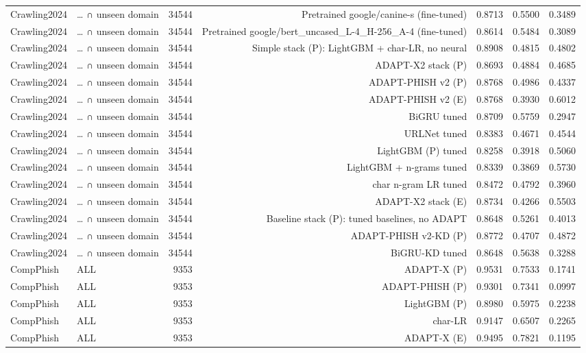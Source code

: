 \begin{table}[t]
\begin{tabular}{llrrrrr}
Crawling2024 & … ∩ unseen domain & 34544 & Pretrained google/canine-s (fine-tuned) & 0.8713 & 0.5500 & 0.3489 \\
Crawling2024 & … ∩ unseen domain & 34544 & Pretrained google/bert\_uncased\_L-4\_H-256\_A-4 (fine-tuned) & 0.8614 & 0.5484 & 0.3089 \\
Crawling2024 & … ∩ unseen domain & 34544 & Simple stack (P): LightGBM + char-LR, no neural & 0.8908 & 0.4815 & 0.4802 \\
Crawling2024 & … ∩ unseen domain & 34544 & ADAPT-X2 stack (P) & 0.8693 & 0.4884 & 0.4685 \\
Crawling2024 & … ∩ unseen domain & 34544 & ADAPT-PHISH v2 (P) & 0.8768 & 0.4986 & 0.4337 \\
Crawling2024 & … ∩ unseen domain & 34544 & ADAPT-PHISH v2 (E) & 0.8768 & 0.3930 & 0.6012 \\
Crawling2024 & … ∩ unseen domain & 34544 & BiGRU tuned & 0.8709 & 0.5759 & 0.2947 \\
Crawling2024 & … ∩ unseen domain & 34544 & URLNet tuned & 0.8383 & 0.4671 & 0.4544 \\
Crawling2024 & … ∩ unseen domain & 34544 & LightGBM (P) tuned & 0.8258 & 0.3918 & 0.5060 \\
Crawling2024 & … ∩ unseen domain & 34544 & LightGBM + n-grams tuned & 0.8339 & 0.3869 & 0.5730 \\
Crawling2024 & … ∩ unseen domain & 34544 & char n-gram LR tuned & 0.8472 & 0.4792 & 0.3960 \\
Crawling2024 & … ∩ unseen domain & 34544 & ADAPT-X2 stack (E) & 0.8734 & 0.4266 & 0.5503 \\
Crawling2024 & … ∩ unseen domain & 34544 & Baseline stack (P): tuned baselines, no ADAPT & 0.8648 & 0.5261 & 0.4013 \\
Crawling2024 & … ∩ unseen domain & 34544 & ADAPT-PHISH v2-KD (P) & 0.8772 & 0.4707 & 0.4872 \\
Crawling2024 & … ∩ unseen domain & 34544 & BiGRU-KD tuned & 0.8648 & 0.5638 & 0.3288 \\
CompPhish & ALL & 9353 & ADAPT-X (P) & 0.9531 & 0.7533 & 0.1741 \\
CompPhish & ALL & 9353 & ADAPT-PHISH (P) & 0.9301 & 0.7341 & 0.0997 \\
CompPhish & ALL & 9353 & LightGBM (P) & 0.8980 & 0.5975 & 0.2238 \\
CompPhish & ALL & 9353 & char-LR & 0.9147 & 0.6507 & 0.2265 \\
CompPhish & ALL & 9353 & ADAPT-X (E) & 0.9495 & 0.7821 & 0.1195 \\

\end{tabular}
\end{table}
